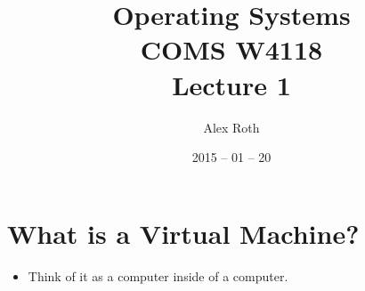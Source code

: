 \documentclass[]{article}
\begin{document}
\newtheorem{thm}{Theorem}
\title{Operating Systems \\ COMS W4118 \\ Lecture 1}
\author{Alex Roth}
\date{2015 -- 01 -- 20}
\maketitle

\section*{What is a Virtual Machine?}
\begin{itemize}
\item Think of it as a computer inside of a computer.
\end{itemize}
\end{document}
